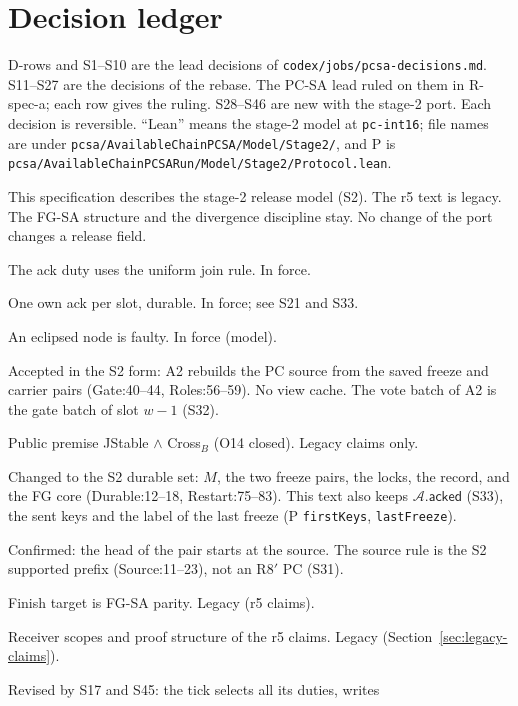 \documentclass{article}
\newcommand{\AC}{\mathcal A}
\newcommand{\acked}{\mathsf{acked}}
\newcommand{\nm}[1]{\nolinkurl{#1}}
\begin{document}
\section{Decision ledger}\label{sec:ledger}

D-rows and S1--S10 are the lead decisions of
\nm{codex/jobs/pcsa-decisions.md}.  S11--S27 are the decisions of the
rebase.  The PC-SA lead ruled on them in R-spec-a; each row gives the
ruling.  S28--S46 are new with the stage-2 port.  Each decision is
reversible.  ``Lean'' means the stage-2 model at \nm{pc-int16}; file names
are under \nm{pcsa/AvailableChainPCSA/Model/Stage2/}, and P is
\nm{pcsa/AvailableChainPCSARun/Model/Stage2/Protocol.lean}.

\begin{description}\setlength{\itemsep}{1pt}
\item[R-spec-a] This specification describes the stage-2 release model
  (S2).  The r5 text is legacy.  The FG-SA structure and the divergence
  discipline stay.  No change of the port changes a release field.
\item[D1] The ack duty uses the uniform join rule.  In force.
\item[D2] One own ack per slot, durable.  In force; see S21 and S33.
\item[D3] An eclipsed node is faulty.  In force (model).
\item[D01] Accepted in the S2 form: A2 rebuilds the PC source from the
  saved freeze and carrier pairs (Gate:40--44, Roles:56--59).  No view
  cache.  The vote batch of A2 is the gate batch of slot $w-1$ (S32).
\item[D02] Public premise JStable $\wedge$ Cross$_B$ (O14 closed).  Legacy
  claims only.
\item[D03] Changed to the S2 durable set: $M$, the two freeze pairs, the
  locks, the record, and the FG core (Durable:12--18, Restart:75--83).
  This text also keeps $\AC.\acked$ (S33), the sent keys and the label of
  the last freeze (P \nm{firstKeys}, \nm{lastFreeze}).
\item[D04] Confirmed: the head of the pair starts at the source.  The
  source rule is the S2 supported prefix (Source:11--23), not an R8$'$ PC
  (S31).
\item[D05] Finish target is FG-SA parity.  Legacy (r5 claims).
\item[D06--D15] Receiver scopes and proof structure of the r5 claims.
  Legacy (Section~\ref{sec:legacy-claims}).
\item[D16] Revised by S17 and S45: the tick selects all its duties, writes

\end{description}
\end{document}
